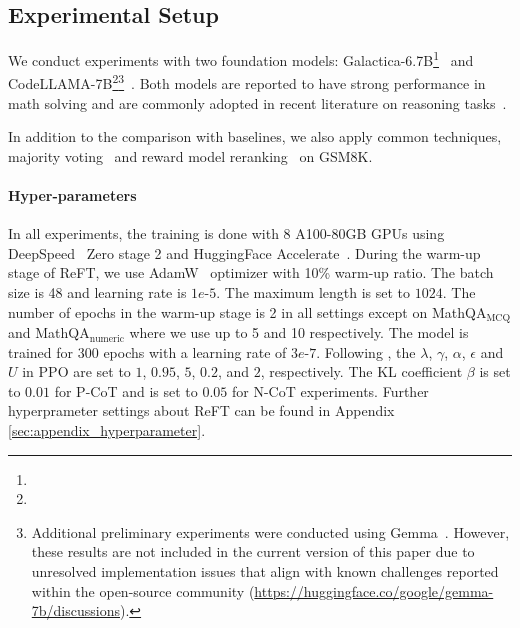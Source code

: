 \subsection{Experimental Setup}
\label{sec:setup}

We conduct experiments with two foundation models: Galactica-6.7B\footnote{}~\cite{taylor2022galactica} and CodeLLAMA-7B\footnote{}\footnote{Additional preliminary experiments were conducted using Gemma~\cite{gemmateam2024gemma}. However, these results are not included in the current version of this paper due to unresolved implementation issues that align with known challenges reported within the open-source community (\url{https://huggingface.co/google/gemma-7b/discussions}).}~\cite{roziere2023code}.
Both models are reported to have strong performance in math solving and are commonly adopted in recent literature on reasoning tasks~\cite{yue2023mammoth,luo2023wizardmath}.

In addition to the comparison with baselines, we also apply common techniques, majority voting~\cite{wang2022self} and reward model reranking~\cite{lightman2023lets} on GSM8K. 

\paragraph{Hyper-parameters}
In all experiments, the training is done with 8 A100-80GB GPUs using DeepSpeed~\cite{rajbhandari2020zero,rasley2020deepspeed} Zero stage 2 and HuggingFace Accelerate~\cite{accelerate}.
During the warm-up stage of ReFT, we use AdamW~\cite{loshchilov2017decoupled} optimizer with 10\% warm-up ratio. 
The batch size is 48 and learning rate is $1e$-$5$.
The maximum length is set to $1024$. 
The number of epochs in the warm-up stage is 2 in all settings except on MathQA$_\text{MCQ}$ and MathQA$_\text{numeric}$ where we use up to 5 and 10 respectively. 
The model is trained for $300$ epochs with a learning rate of $3e$-$7$.
Following \citet{ziegler2019fine}, the $\lambda$, $\gamma$, $\alpha$, $\epsilon$ and $U$ in PPO are set to $1$, $0.95$, $5$, $0.2$, and $2$, respectively.
The KL coefficient $\beta$ is set to $0.01$ for P-CoT and is set to $0.05$ for N-CoT experiments. 
Further hyperprameter settings about ReFT can be found in Appendix \ref{sec:appendix_hyperparameter}.

